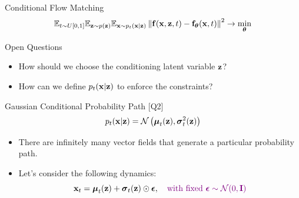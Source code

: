 \documentclass{beamer}
\renewcommand{\eqpause}{}
\begin{document}
\begin{frame}{Conditional Flow Matching}
	\vspace{-0.3cm}
	\[
		\mathbb{E}_{t \sim U[0, 1]} \mathbb{E}_{\mathbf{z} \sim p(\mathbf{z})} \mathbb{E}_{\mathbf{x} \sim p_t(\mathbf{x} | \mathbf{z})}\left\| \mathbf{f}(\mathbf{x}, \mathbf{z}, t) - \mathbf{f}_{\boldsymbol{\theta}}(\mathbf{x}, t) \right\|^2 \rightarrow \min_{\boldsymbol{\theta}}
	\]
	\eqpause
	\vspace{-0.4cm}
	\begin{block}{Open Questions}
		\begin{itemize}
			\item[Q1] How should we choose the conditioning latent variable $\mathbf{z}$?
			\item[Q2] How can we define $p_t(\mathbf{x} | \mathbf{z})$ to enforce the constraints?
		\end{itemize}
	\end{block}
	\eqpause
	\vspace{-0.3cm}
	\begin{block}{Gaussian Conditional Probability Path [Q2]}
		\vspace{-0.3cm}
		\[
			p_t(\mathbf{x} | \mathbf{z}) = \mathcal{N}\left(\boldsymbol{\mu}_t(\mathbf{z}), \boldsymbol{\sigma}_t^2(\mathbf{z})\right)
		\]
		\eqpause
		\vspace{-0.5cm}
	\end{block}
	\begin{itemize}
		\item There are infinitely many vector fields that generate a particular probability path.
		\item Let's consider the following dynamics:
		\[
			\mathbf{x}_t = \boldsymbol{\mu}_t(\mathbf{z}) + \boldsymbol{\sigma}_t(\mathbf{z}) \odot \boldsymbol{\epsilon}, \quad {\color{violet} \text{with fixed } \boldsymbol{\epsilon}\sim \mathcal{N}(0, \mathbf{I})}
		\]
	\end{itemize}
\end{frame}
\end{document}

